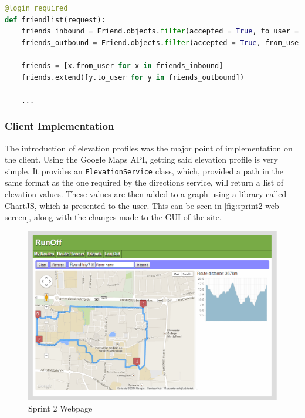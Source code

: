 \begin{lstlisting}[label={lst:sprint2-get-friends},caption={'Friend List' function},language={Python}]
@login_required
def friendlist(request):
	friends_inbound = Friend.objects.filter(accepted = True, to_user = request.user)
	friends_outbound = Friend.objects.filter(accepted = True, from_user = request.user)
	
	friends = [x.from_user for x in friends_inbound]
	friends.extend([y.to_user for y in friends_outbound])
	
	...
\end{lstlisting}

\subsubsection{Client Implementation}

The introduction of elevation profiles was the major point of implementation on the client. Using the Google Maps \ac{API}, getting said elevation profile is very simple. It provides an \texttt{ElevationService} class, which, provided a path in the same format as the one required by the directions service, will return a list of elevation values. These values are then added to a graph using a library called ChartJS\cite{chartjs}, which is presented to the user. This can be seen in \autoref{fig:sprint2-web-screen}, along with the changes made to the \ac{GUI} of the site.

\begin{figure}[ht]
 \caption{Sprint 2 Webpage}
 \label{fig:sprint2-web-screen}
 \includegraphics[width=\textwidth]{img/webplanner2.png}
\end{figure}

